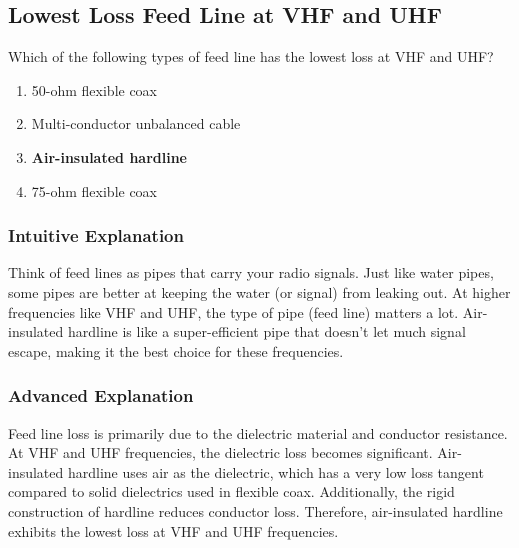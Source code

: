 \subsection{Lowest Loss Feed Line at VHF and UHF}
\label{T9B11}

\begin{tcolorbox}[colback=gray!10!white,colframe=black!75!black,title=T9B11]
Which of the following types of feed line has the lowest loss at VHF and UHF?
\begin{enumerate}[noitemsep]
    \item 50-ohm flexible coax
    \item Multi-conductor unbalanced cable
    \item \textbf{Air-insulated hardline}
    \item 75-ohm flexible coax
\end{enumerate}
\end{tcolorbox}

\subsubsection*{Intuitive Explanation}
Think of feed lines as pipes that carry your radio signals. Just like water pipes, some pipes are better at keeping the water (or signal) from leaking out. At higher frequencies like VHF and UHF, the type of pipe (feed line) matters a lot. Air-insulated hardline is like a super-efficient pipe that doesn't let much signal escape, making it the best choice for these frequencies.

\subsubsection*{Advanced Explanation}
Feed line loss is primarily due to the dielectric material and conductor resistance. At VHF and UHF frequencies, the dielectric loss becomes significant. Air-insulated hardline uses air as the dielectric, which has a very low loss tangent compared to solid dielectrics used in flexible coax. Additionally, the rigid construction of hardline reduces conductor loss. Therefore, air-insulated hardline exhibits the lowest loss at VHF and UHF frequencies.